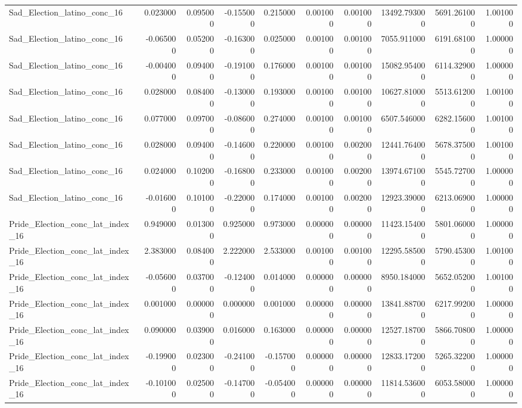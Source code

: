 \begin{table}
\begin{tabular}{lrrrrrrrrr}
Sad_Election_latino_conc_16 & 0.023000 & 0.095000 & -0.155000 & 0.215000 & 0.001000 & 0.001000 & 13492.793000 & 5691.261000 & 1.001000 \\
Sad_Election_latino_conc_16 & -0.065000 & 0.052000 & -0.163000 & 0.025000 & 0.001000 & 0.001000 & 7055.911000 & 6191.681000 & 1.000000 \\
Sad_Election_latino_conc_16 & -0.004000 & 0.094000 & -0.191000 & 0.176000 & 0.001000 & 0.001000 & 15082.954000 & 6114.329000 & 1.000000 \\
Sad_Election_latino_conc_16 & 0.028000 & 0.084000 & -0.130000 & 0.193000 & 0.001000 & 0.001000 & 10627.810000 & 5513.612000 & 1.001000 \\
Sad_Election_latino_conc_16 & 0.077000 & 0.097000 & -0.086000 & 0.274000 & 0.001000 & 0.001000 & 6507.546000 & 6282.156000 & 1.001000 \\
Sad_Election_latino_conc_16 & 0.028000 & 0.094000 & -0.146000 & 0.220000 & 0.001000 & 0.002000 & 12441.764000 & 5678.375000 & 1.001000 \\
Sad_Election_latino_conc_16 & 0.024000 & 0.102000 & -0.168000 & 0.233000 & 0.001000 & 0.002000 & 13974.671000 & 5545.727000 & 1.000000 \\
Sad_Election_latino_conc_16 & -0.016000 & 0.101000 & -0.220000 & 0.174000 & 0.001000 & 0.002000 & 12923.390000 & 6213.069000 & 1.000000 \\
Pride_Election_conc_lat_index_16 & 0.949000 & 0.013000 & 0.925000 & 0.973000 & 0.000000 & 0.000000 & 11423.154000 & 5801.060000 & 1.000000 \\
Pride_Election_conc_lat_index_16 & 2.383000 & 0.084000 & 2.222000 & 2.533000 & 0.001000 & 0.001000 & 12295.585000 & 5790.453000 & 1.001000 \\
Pride_Election_conc_lat_index_16 & -0.056000 & 0.037000 & -0.124000 & 0.014000 & 0.000000 & 0.000000 & 8950.184000 & 5652.052000 & 1.001000 \\
Pride_Election_conc_lat_index_16 & 0.001000 & 0.000000 & 0.000000 & 0.001000 & 0.000000 & 0.000000 & 13841.887000 & 6217.992000 & 1.000000 \\
Pride_Election_conc_lat_index_16 & 0.090000 & 0.039000 & 0.016000 & 0.163000 & 0.000000 & 0.000000 & 12527.187000 & 5866.708000 & 1.000000 \\
Pride_Election_conc_lat_index_16 & -0.199000 & 0.023000 & -0.241000 & -0.157000 & 0.000000 & 0.000000 & 12833.172000 & 5265.322000 & 1.000000 \\
Pride_Election_conc_lat_index_16 & -0.101000 & 0.025000 & -0.147000 & -0.054000 & 0.000000 & 0.000000 & 11814.536000 & 6053.580000 & 1.000000 \\

\end{tabular}
\end{table}

